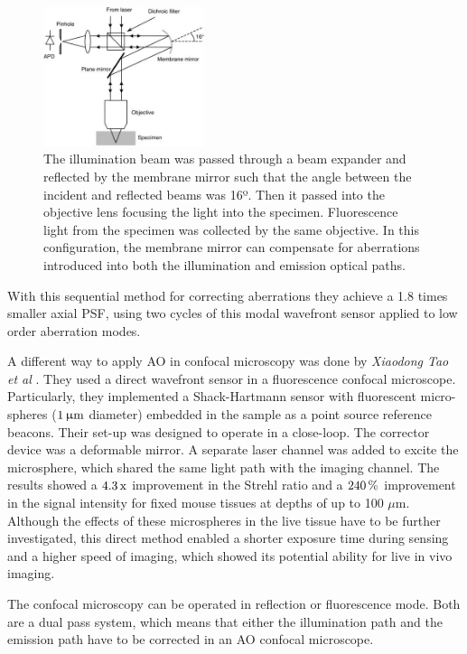 \begin{figure}[htbp]
	\centering
		\includegraphics[width=0.42\textwidth,height=0.22\textheight]{images/AOM_scan_CFM.jpg}
		\caption{The illumination beam was passed through a beam expander and reflected by the membrane mirror such that the angle between the incident and reflected beams was 16º. Then it passed into the objective lens focusing the light into the specimen. Fluorescence light from the specimen was collected by the same objective. In this configuration, the membrane mirror can compensate for aberrations introduced into both the illumination and emission optical paths.}
	\label{fig:AOM_scan_CFM}
\end{figure}
  
With this sequential method for correcting aberrations they achieve a 1.8 times smaller axial PSF, using two cycles of this modal wavefront sensor applied to low order aberration modes.

A different way to apply AO in confocal microscopy was done by \textit{Xiaodong Tao et al} \cite{scan_Confocal_direct_sensing}. They used a direct wavefront sensor in a fluorescence confocal microscope. Particularly, they implemented a Shack-Hartmann sensor with fluorescent micro-spheres ($\unit[1]{\upmu m}$ diameter) embedded in the sample as a point source reference beacons. Their set-up was designed to operate in a close-loop. The corrector device was a deformable mirror. A separate laser channel was added to excite the microsphere, which shared the same light path with the imaging channel. The results showed a $\unit[4.3]{\text{x}}$ improvement in the Strehl ratio and a $\unit[240]{\%}$ improvement in the signal intensity for fixed mouse tissues at depths of up to 100 $\mu$m. Although the effects of these microspheres in the live tissue have to be further investigated, this direct method enabled a shorter exposure time during sensing and a higher speed of imaging, which showed its potential ability for live in vivo imaging.

The confocal microscopy can be operated in reflection or fluorescence mode. Both are a dual pass system, which means that either the illumination path and the emission path have to be corrected in an AO confocal microscope. 

